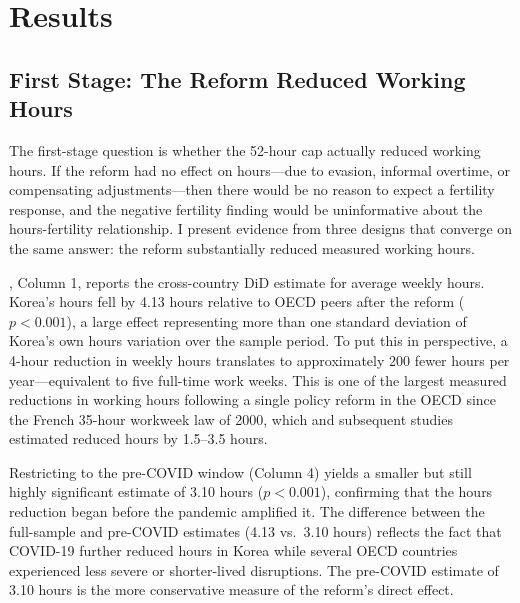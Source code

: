 \documentclass[12pt]{article}
\begin{document}
\section{Results}

\subsection{First Stage: The Reform Reduced Working Hours}

The first-stage question is whether the 52-hour cap actually reduced working hours. If the reform had no effect on hours---due to evasion, informal overtime, or compensating adjustments---then there would be no reason to expect a fertility response, and the negative fertility finding would be uninformative about the hours-fertility relationship. I present evidence from three designs that converge on the same answer: the reform substantially reduced measured working hours.

, Column 1, reports the cross-country DiD estimate for average weekly hours. Korea's hours fell by 4.13 hours relative to OECD peers after the reform ($p < 0.001$), a large effect representing more than one standard deviation of Korea's own hours variation over the sample period. To put this in perspective, a 4-hour reduction in weekly hours translates to approximately 200 fewer hours per year---equivalent to five full-time work weeks. This is one of the largest measured reductions in working hours following a single policy reform in the OECD since the French 35-hour workweek law of 2000, which \citet{hunt1999has} and subsequent studies estimated reduced hours by 1.5--3.5 hours.

Restricting to the pre-COVID window (Column 4) yields a smaller but still highly significant estimate of 3.10 hours ($p < 0.001$), confirming that the hours reduction began before the pandemic amplified it. The difference between the full-sample and pre-COVID estimates (4.13 vs.\ 3.10 hours) reflects the fact that COVID-19 further reduced hours in Korea while several OECD countries experienced less severe or shorter-lived disruptions. The pre-COVID estimate of 3.10 hours is the more conservative measure of the reform's direct effect.
\end{document}
